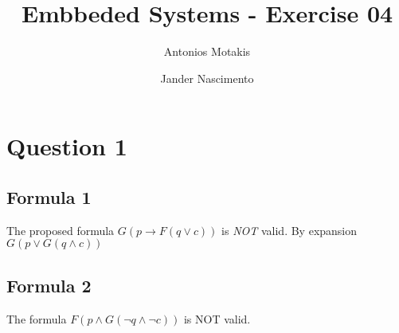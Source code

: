 \documentclass[a4paper]{article}
\title{Embbeded Systems - Exercise 04}
\author{Antonios Motakis \and Jander Nascimento}
\begin{document}
\section*{Question 1}

\subsection*{Formula 1}

The proposed formula $G(p \rightarrow F (q \lor c))$ is \emph{NOT} valid. By expansion $G(p \lor G(q \land c))$

\subsection*{Formula 2}

The formula $F(p \land G (\neg q \land \neg c))$ is NOT valid.
\end{document}
